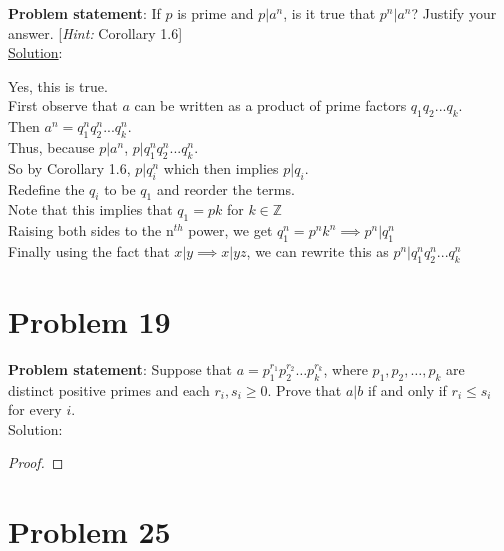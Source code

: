 \documentclass{article} %
\begin{document}
\textbf{Problem statement}: If $p$ is prime and $p|a^n$, is it true that $p^n|a^n$?  Justify your answer. [\textit{Hint:} Corollary 1.6]
\\

\underline{Solution}: 
\begin{addmargin}[1em]{0em}
Yes, this is true.
\\First observe that $a$ can be written as a product of prime factors $q_1q_2 ... q_k$.
\\Then $a^n = q_1^nq_2^n ... q_k^n$.
\\Thus, because $p|a^n$, $p|q_1^nq_2^n ... q_k^n$.
\\So by Corollary 1.6, $p|q_i^n$ which then implies $p|q_i$.
\\Redefine the $q_i$ to be $q_1$ and reorder the terms.
\\Note that this implies that $q_1 = pk$ for $k \in \mathbb{Z}$
\\Raising both sides to the n$^{th}$ power, we get $q_1^n = p^nk^n \implies p^n|q_1^n$
\\Finally using the fact that $x|y \implies x|yz$, we can rewrite this as $p^n|q_1^nq_2^n ... q_k^n$
\end{addmargin}

\newpage

\section*{Problem 19}


\textbf{Problem statement}: Suppose that $a = p_1^{r_1}p_2^{r_2} \ldots p_k^{r_k}$, where $p_1,p_2,\ldots,p_k$ are distinct positive primes and each $r_i,s_i \geq 0$.  Prove that $a|b$ if and only if $r_i \leq s_i$ for every $i$.
\\

Solution: 
\begin{addmargin}[1em]{0em}
\begin{proof}

\end{proof}
\end{addmargin}

\newpage

\section*{Problem 25}
\end{document}
